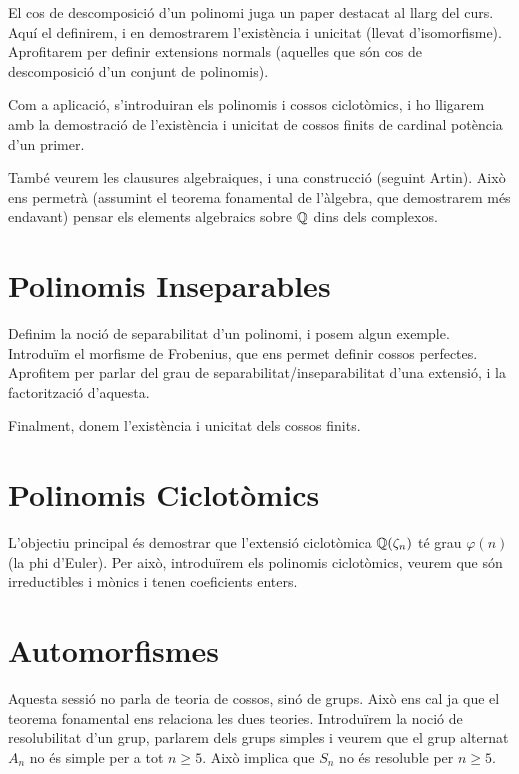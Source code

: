 \documentclass[
]{book}
\theoremstyle{definition}
\theoremstyle{definition}
\theoremstyle{definition}
\theoremstyle{definition}
\theoremstyle{remark}
\begin{document}
El cos de descomposició d'un polinomi juga un paper destacat al llarg del curs.
Aquí el definirem, i en demostrarem l'existència i unicitat (llevat d'isomorfisme).
Aprofitarem per definir extensions normals (aquelles que són cos de descomposició d'un conjunt de polinomis).

Com a aplicació, s'introduiran els polinomis i cossos ciclotòmics, i ho lligarem amb la
demostració de l'existència i unicitat de cossos finits de cardinal potència d'un primer.

També veurem les clausures algebraiques, i una construcció (seguint Artin). Això ens permetrà (assumint el teorema fonamental
de l'àlgebra, que demostrarem més endavant) pensar els elements algebraics sobre \(\mathbb{Q}\) dins dels complexos.

\hypertarget{polinomis-inseparables}{%
\chapter{Polinomis Inseparables}\label{polinomis-inseparables}}

Definim la noció de separabilitat d'un polinomi, i posem algun exemple. Introduïm el morfisme de Frobenius,
que ens permet definir cossos perfectes. Aprofitem per parlar del grau de separabilitat/inseparabilitat d'una
extensió, i la factorització d'aquesta.

Finalment, donem l'existència i unicitat dels cossos finits.

\hypertarget{polinomis-ciclotuxf2mics}{%
\chapter{Polinomis Ciclotòmics}\label{polinomis-ciclotuxf2mics}}

L'objectiu principal és demostrar que l'extensió ciclotòmica \(\mathbb{Q}(\zeta_n)\) té grau \(\varphi(n)\) (la phi d'Euler). Per això,
introduïrem els polinomis ciclotòmics, veurem que són irreductibles i mònics i tenen coeficients enters.

\hypertarget{automorfismes}{%
\chapter{Automorfismes}\label{automorfismes}}

Aquesta sessió no parla de teoria de cossos, sinó de grups. Això ens cal ja que el teorema fonamental ens relaciona les dues teories. Introduïrem
la noció de resolubilitat d'un grup, parlarem dels grups simples i veurem que el grup alternat \(A_n\) no és simple per a tot \(n \geq 5\). Això
implica que \(S_n\) no és resoluble per \(n\geq 5\).
\end{document}
